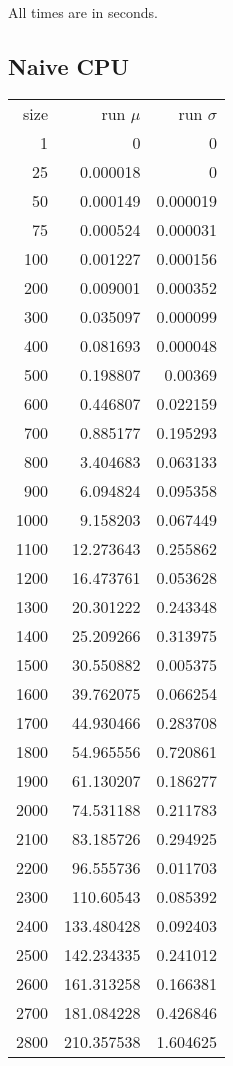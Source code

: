 All times are in seconds.

\subsection*{Naive CPU}

\begin{longtable}{r r r}
size & run $\mu$ & run $\sigma$ \\
1 & 0 & 0 \\
25 & 0.000018 & 0 \\
50 & 0.000149 & 0.000019 \\
75 & 0.000524 & 0.000031 \\
100 & 0.001227 & 0.000156 \\
200 & 0.009001 & 0.000352 \\
300 & 0.035097 & 0.000099 \\
400 & 0.081693 & 0.000048 \\
500 & 0.198807 & 0.00369 \\
600 & 0.446807 & 0.022159 \\
700 & 0.885177 & 0.195293 \\
800 & 3.404683 & 0.063133 \\
900 & 6.094824 & 0.095358 \\
1000 & 9.158203 & 0.067449 \\
1100 & 12.273643 & 0.255862 \\
1200 & 16.473761 & 0.053628 \\
1300 & 20.301222 & 0.243348 \\
1400 & 25.209266 & 0.313975 \\
1500 & 30.550882 & 0.005375 \\
1600 & 39.762075 & 0.066254 \\
1700 & 44.930466 & 0.283708 \\
1800 & 54.965556 & 0.720861 \\
1900 & 61.130207 & 0.186277 \\
2000 & 74.531188 & 0.211783 \\
2100 & 83.185726 & 0.294925 \\
2200 & 96.555736 & 0.011703 \\
2300 & 110.60543 & 0.085392 \\
2400 & 133.480428 & 0.092403 \\
2500 & 142.234335 & 0.241012 \\
2600 & 161.313258 & 0.166381 \\
2700 & 181.084228 & 0.426846 \\
2800 & 210.357538 & 1.604625 \\

\end{longtable}

